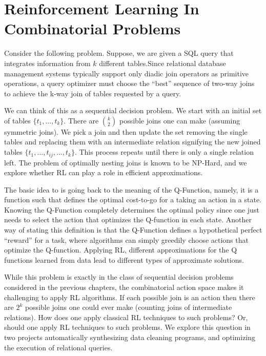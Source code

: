 \chapter{Reinforcement Learning In Combinatorial Problems} \label{comb}
Consider the following problem. Suppose, we are given a SQL query that integrates information from $k$ different tables.Since relational database management systems typically support only diadic join operators as primitive operations, a query optimizer must choose the ``best'' sequence of two-way joins to achieve the k-way join of
tables requested by a query. 

We can think of this as a sequential decision problem. We start with an initial set of tables $\{t_1,...,t_k\}$. There are $\binom{k}{2}$ possible joins one can make (assuming symmetric joins).
We pick a join and then update the set removing the single tables and replacing them with an intermediate relation signifying the new joined tables $\{t_1,...,t_{ij},...,t_k\}$. This process repeats until there is only a single relation left. The problem of optimally nesting joins is known to be NP-Hard, and we explore whether RL can play a role in efficient approximations.

The basic idea to is going back to the meaning of the Q-Function, namely, it is a function such that defines the optimal cost-to-go for a taking an action in a state. Knowing the Q-Function completely determines the optimal policy since one just needs to select the action that optimizes the Q-function in each state. Another way of stating this definition is that the Q-Function defines a hypothetical perfect ``reward'' for a task, where algorithms can simply greedily choose actions that optimize the Q-function. Applying RL, different approximations for the Q functions learned from data lead to different types of approximate solutions.

While this problem is exactly in the class of sequential decision problems considered in the previous chapters, the combinatorial action space makes it challenging to apply RL algorithms. If each possible join is an action then there are $2^{k}$ possible joins one could ever make (counting joins of intermediate relations). How does one apply classical RL techniques to such problems? Or, should one apply RL techniques to such problems.
We explore this question in two projects automatically synthesizing data cleaning programs, and optimizing the execution of relational queries.

